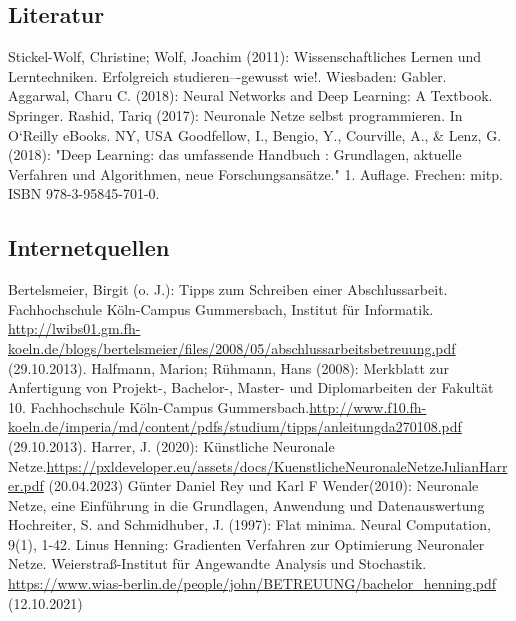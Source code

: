 \documentclass[a4paper,12pt,oneside]{article}
\begin{document}
    \subsection{Literatur}
    \renewcommand{\refname}{} %
    \begin{thebibliography}{SW11} %
       Stickel-Wolf, Christine; Wolf, Joachim (2011): Wissenschaftliches Lernen und Lerntechniken. Erfolgreich studieren–-gewusst wie!. Wiesbaden: Gabler. 
       Aggarwal, Charu C. (2018): Neural Networks and Deep Learning: A Textbook. Springer.
       Rashid, Tariq (2017): Neuronale Netze selbst programmieren. In O`Reilly eBooks. NY, USA
       Goodfellow, I., Bengio, Y., Courville, A., \& Lenz, G. (2018): "Deep Learning: das umfassende Handbuch : Grundlagen, aktuelle Verfahren und Algorithmen, neue Forschungsansätze." 1. Auflage. Frechen: mitp. ISBN 978-3-95845-701-0.
    \end{thebibliography} 
        
    \subsection{Internetquellen}
    \begin{thebibliography}{HR08} %
       Bertelsmeier, Birgit (o. J.): Tipps zum Schrei\-b\-en ei\-n\-er Ab\-sch\-luss\-ar\-beit. Fach\-hoch\-schu\-le Köln-Campus Gummersbach, Institut für Informatik. \url{http://lwibs01.gm.fh-koeln.de/blogs/bertelsmeier/files/2008/05/abschlussarbeitsbetreuung.pdf} (29.10.2013).
       Halfmann, Marion; Rühmann, Hans (2008): Merkblatt zur Anfertigung von Projekt-, Bachelor-, Master- und Diplomarbeiten der Fakultät 10. Fachhochschule Köln-Campus Gummersbach.\url{http://www.f10.fh-koeln.de/imperia/md/content/pdfs/studium/tipps/anleitungda270108.pdf} (29.10.2013).
       Harrer, J. (2020): Künstliche Neuronale Netze.\url{https://pxldeveloper.eu/assets/docs/KuenstlicheNeuronaleNetzeJulianHarrer.pdf} (20.04.2023)
       Günter Daniel Rey und Karl F Wender(2010): Neuronale Netze, eine Einführung in die Grundlagen, Anwendung und Datenauswertung
       Hochreiter, S. and Schmidhuber, J. (1997): Flat minima. Neural Computation, 9(1), 1-42.
       Linus Henning: Gradienten Verfahren zur Optimierung Neuronaler Netze. Weierstraß-Institut für Angewandte Analysis und Stochastik. \url{https://www.wias-berlin.de/people/john/BETREUUNG/bachelor_henning.pdf} (12.10.2021)
    \end{thebibliography} 
  
\end{document}

